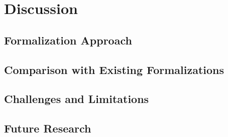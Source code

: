 
\chapter{Discussion}\label{chapter:discussion}

\section{Formalization Approach}
\section{Comparison with Existing Formalizations}
\section{Challenges and Limitations}
\section{Future Research}
